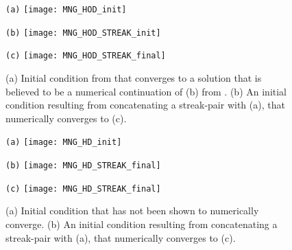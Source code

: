 \begin{description}
\begin{figure}
\begin{minipage}[height=.3\textheight]{.32\textwidth}
\centering \small{\texttt{(a)}}
\texttt{[image: MNG\_HOD\_init]}
\end{minipage}
\begin{minipage}[height=.3\textheight]{.32\textwidth}
\centering \small{\texttt{(b)}}
\texttt{[image: MNG\_HOD\_STREAK\_init]}
\end{minipage}
\begin{minipage}[height=.3\textheight]{.32\textwidth}
\centering \small{\texttt{(c)}}
\texttt{[image: MNG\_HOD\_STREAK\_final]}
\end{minipage}
\caption{ \label{fig:MNGhodstreak}
(a) Initial condition from  that converges to
a solution that is believed to be a numerical continuation of (b) from . (b) An initial condition
resulting from concatenating a streak-pair with (a), that
numerically converges to (c).
}
\end{figure}

\begin{figure}
\begin{minipage}[height=.3\textheight]{.32\textwidth}
\centering \small{\texttt{(a)}}
\texttt{[image: MNG\_HD\_init]}
\end{minipage}
\begin{minipage}[height=.3\textheight]{.32\textwidth}
\centering \small{\texttt{(b)}}
\texttt{[image: MNG\_HD\_STREAK\_final]}
\end{minipage}
\begin{minipage}[height=.3\textheight]{.32\textwidth}
\centering \small{\texttt{(c)}}
\texttt{[image: MNG\_HD\_STREAK\_final]}
\end{minipage}
\caption{ \label{fig:MNGhdstreak}
(a) Initial condition that has not been shown to numerically converge. (b) An initial condition
resulting from concatenating a streak-pair with (a), that
numerically converges to (c).
}
\end{figure}


\end{description}
